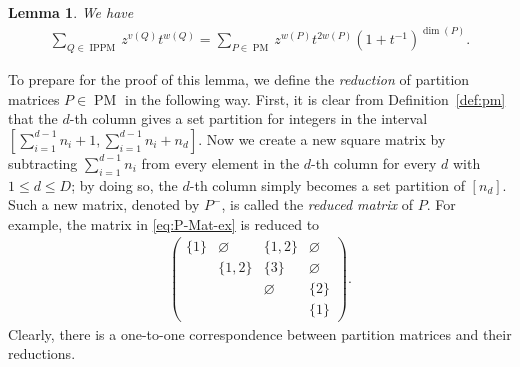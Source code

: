 \documentclass[12pt,reqno]{amsart}
\numberwithin{equation}{section}
\theoremstyle{theorem}
\newtheorem{lemma}[theorem]{Lemma}
\theoremstyle{definition}
\theoremstyle{named}
\newcommand{\MatP}{\operatorname{PM}}
\newcommand{\sw}{v}
\newcommand{\IPPM}{\operatorname{IPPM}}
\begin{document}
\begin{lemma}\label{le:GF-MIP-MatP}
	We have
	\begin{align}\label{eq:GF-MIP-MatP}
		\sum_{Q\in \IPPM} z^{\sw(Q)} t^{w(Q)} = \sum_{P\in \MatP} z^{w(P)} t^{2w(P)} (1+t^{-1})^{\dim(P)}.
	\end{align}
\end{lemma}

To prepare for the proof of this lemma, we define the \emph{reduction} of partition matrices $P\in \MatP$ in the following way. First, it is clear from Definition~\ref{def:pm} that the $d$-th column gives a set partition for integers in the interval $[\sum_{i=1}^{d-1} n_i+1,\sum_{i=1}^{d-1} n_i+n_d]$. Now we create a new square matrix by subtracting $\sum_{i=1}^{d-1} n_i$ from every element in the $d$-th column for every $d$ with $1\le d\le D$; by doing so, the $d$-th column simply becomes a set partition of $[n_d]$. Such a new matrix, denoted by $P^-$, is called the \emph{reduced matrix} of $P$. For example, the matrix in \eqref{eq:P-Mat-ex} is reduced to
\begin{align}\label{eq:RD-Mat-ex}
	\begin{pmatrix}
		\{1\} & \varnothing & \{1,2\} & \varnothing\\
		& \{1,2\} & \{3\} & \varnothing\\
		& & \varnothing & \{2\}\\
		& & & \{1\}
	\end{pmatrix}.
\end{align}
Clearly, there is a one-to-one correspondence between partition matrices and their reductions.
\end{document}
